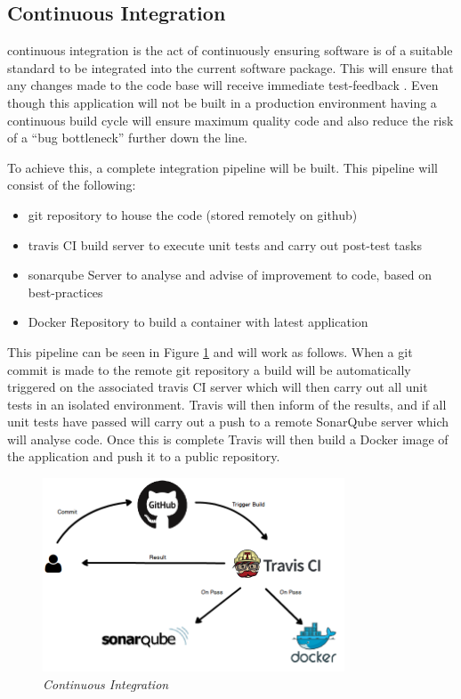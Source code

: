\subsection{Continuous Integration}
\label{subs:CI}
\gls{continuous integration} is the act of continuously ensuring software is of a suitable standard to be integrated into the current software package. This will ensure that any changes made to the code base will receive immediate test-feedback \citep{Fowler2006}. Even though this application will not be built in a production environment having a continuous build cycle will ensure maximum quality code and also reduce the risk of a ``bug bottleneck'' further down the line.

To achieve this, a complete integration pipeline will be built. This pipeline will consist of the following:

\begin{itemize}
	\item \gls{git} repository to house the code (stored remotely on \gls{github})
	\item \gls{travis} CI build server to execute unit tests and carry out post-test tasks
	\item \gls{sonarqube} Server to analyse and advise of improvement to code, based on best-practices
	\item Docker Repository to build a container with latest application
\end{itemize}

This pipeline can be seen in Figure \ref{fig:CI} and will work as follows. When a git commit is made to the remote git repository a build will be automatically triggered on the associated \gls{travis} CI server which will then carry out all unit tests in an isolated environment. Travis will then inform of the results, and if all unit tests have passed will carry out a push to a remote SonarQube server which will analyse code. Once this is complete Travis will then build a Docker image of the application and push it to a public repository.

\begin{figure}[!ht]
\centering
\includegraphics*[width=0.8\textwidth]{images/CI}
\caption{\em Continuous Integration}
\label{fig:CI}
\end{figure}

